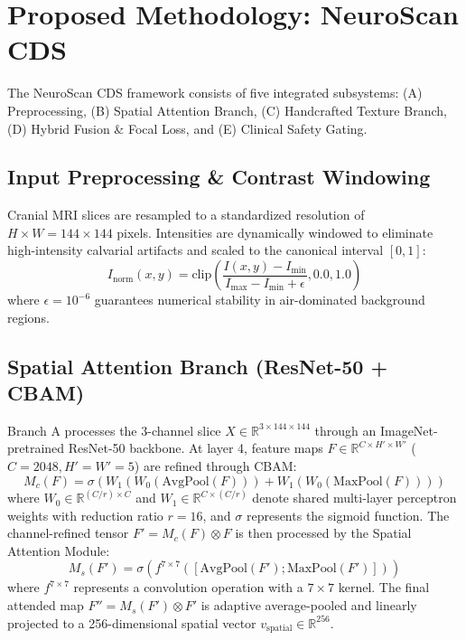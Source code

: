 \documentclass[journal,twocolumn,10pt]{IEEEtran}
\begin{document}
\section{Proposed Methodology: NeuroScan CDS}

The NeuroScan CDS framework consists of five integrated subsystems: (A) Preprocessing, (B) Spatial Attention Branch, (C) Handcrafted Texture Branch, (D) Hybrid Fusion \& Focal Loss, and (E) Clinical Safety Gating.

\subsection{Input Preprocessing \& Contrast Windowing}
Cranial MRI slices are resampled to a standardized resolution of $H \times W = 144 \times 144$ pixels. Intensities are dynamically windowed to eliminate high-intensity calvarial artifacts and scaled to the canonical interval $[0, 1]$:
\begin{equation}
    I_{\text{norm}}(x, y) = \text{clip}\left(\frac{I(x, y) - I_{\text{min}}}{I_{\text{max}} - I_{\text{min}} + \epsilon}, 0.0, 1.0\right)
    \label{eq:norm}
\end{equation}
where $\epsilon = 10^{-6}$ guarantees numerical stability in air-dominated background regions.

\subsection{Spatial Attention Branch (ResNet-50 + CBAM)}
Branch A processes the 3-channel slice $X \in \mathbb{R}^{3 \times 144 \times 144}$ through an ImageNet-pretrained ResNet-50 backbone. At layer 4, feature maps $F \in \mathbb{R}^{C \times H' \times W'}$ ($C = 2048, H' = W' = 5$) are refined through CBAM:
\begin{equation}
    M_c(F) = \sigma\left(W_1(W_0(\text{AvgPool}(F))) + W_1(W_0(\text{MaxPool}(F)))\right)
    \label{eq:channel_att}
\end{equation}
where $W_0 \in \mathbb{R}^{(C/r) \times C}$ and $W_1 \in \mathbb{R}^{C \times (C/r)}$ denote shared multi-layer perceptron weights with reduction ratio $r = 16$, and $\sigma$ represents the sigmoid function. The channel-refined tensor $F' = M_c(F) \otimes F$ is then processed by the Spatial Attention Module:
\begin{equation}
    M_s(F') = \sigma\left(f^{7 \times 7}\left([\text{AvgPool}(F'); \text{MaxPool}(F')]\right)\right)
    \label{eq:spatial_att}
\end{equation}
where $f^{7 \times 7}$ represents a convolution operation with a $7 \times 7$ kernel. The final attended map $F'' = M_s(F') \otimes F'$ is adaptive average-pooled and linearly projected to a 256-dimensional spatial vector $v_{\text{spatial}} \in \mathbb{R}^{256}$.
\end{document}
